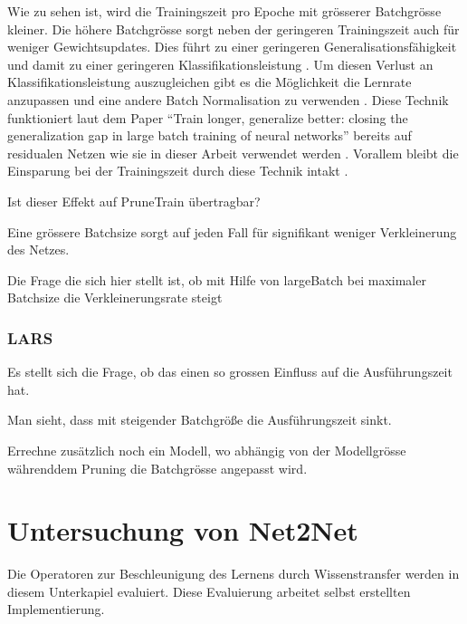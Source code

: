 Wie zu sehen ist, wird die Trainingszeit pro Epoche mit grösserer Batchgrösse kleiner. Die höhere Batchgrösse sorgt neben der geringeren Trainingszeit auch für weniger Gewichtsupdates. Dies führt zu einer geringeren Generalisationsfähigkeit und damit zu einer geringeren Klassifikationsleistung \cite{largeBatch}. Um diesen Verlust an Klassifikationsleistung auszugleichen gibt es die Möglichkeit die Lernrate anzupassen und eine andere Batch Normalisation zu verwenden \cite{largeBatch}. Diese Technik funktioniert laut dem Paper "`Train longer, generalize better: closing the generalization gap in large batch training of neural networks"' bereits auf residualen Netzen wie sie in dieser Arbeit verwendet werden \cite{largeBatch}. Vorallem bleibt die Einsparung bei der Trainingszeit durch diese Technik intakt \cite{largeBatch}.

Ist dieser Effekt auf PruneTrain übertragbar?


Eine grössere Batchsize sorgt auf jeden Fall für signifikant weniger Verkleinerung des Netzes.

Die Frage die sich hier stellt ist, ob mit Hilfe von largeBatch bei maximaler Batchsize die Verkleinerungsrate steigt  


\subsubsection{LARS}




Es stellt sich die Frage, ob das einen so grossen Einfluss auf die Ausführungszeit hat.



Man sieht, dass mit steigender Batchgröße die Ausführungszeit sinkt. 

Errechne zusätzlich noch ein Modell, wo abhängig von der Modellgrösse währenddem Pruning die Batchgrösse angepasst wird.





\section{Untersuchung von Net2Net}\label{sec:net2netexperimente}
\color{blue1}
Die Operatoren zur Beschleunigung des Lernens durch Wissenstransfer werden in diesem Unterkapiel evaluiert. Diese Evaluierung arbeitet selbst erstellten Implementierung.

